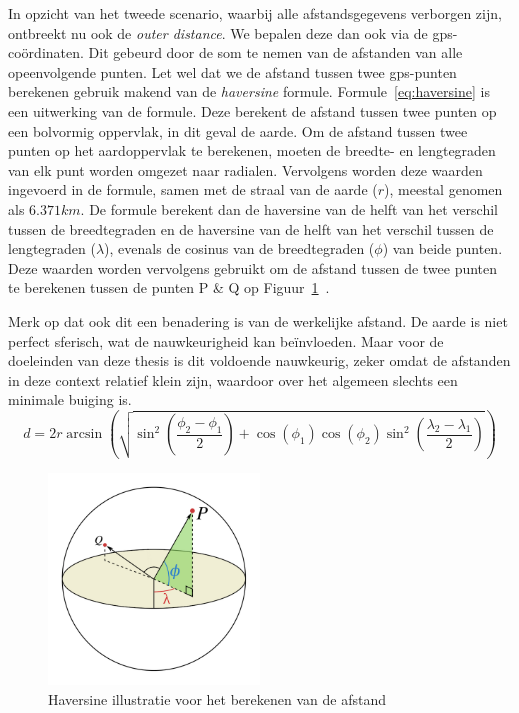 In opzicht van het tweede scenario, waarbij alle afstandsgegevens verborgen
zijn, ontbreekt nu ook de \textit{outer distance}. We bepalen deze dan ook via
de \ac{gps}-coördinaten. Dit gebeurd door de som te nemen van de afstanden van
alle opeenvolgende punten. Let wel dat we de afstand tussen twee
\ac{gps}-punten berekenen gebruik makend van de \textit{haversine} formule.
Formule~\ref{eq:haversine} is een uitwerking van de formule. Deze berekent de
afstand tussen twee punten op een bolvormig oppervlak, in dit geval de aarde.
Om de afstand tussen twee punten op het aardoppervlak te berekenen, moeten de
breedte- en lengtegraden van elk punt worden omgezet naar radialen. Vervolgens
worden deze waarden ingevoerd in de formule, samen met de straal van de aarde
($r$), meestal genomen als $6.371 km$. De formule berekent dan de haversine van
de helft van het verschil tussen de breedtegraden en de haversine van de helft
van het verschil tussen de lengtegraden ($\lambda$), evenals de cosinus van de
breedtegraden ($\phi$) van beide punten. Deze waarden worden vervolgens
gebruikt om de afstand tussen de twee punten te berekenen tussen de punten P \&
Q op Figuur~\ref{fig:haversine}~\cite{sheppard1922practical}.

Merk op dat ook dit een benadering is van de werkelijke afstand. De aarde is
niet perfect sferisch, wat de nauwkeurigheid kan beïnvloeden. Maar voor de
doeleinden van deze thesis is dit voldoende nauwkeurig, zeker omdat de
afstanden in deze context relatief klein zijn, waardoor over het algemeen
slechts een minimale buiging is.
\begin{equation}\label{eq:haversine}
    d = 2r \arcsin\left(\sqrt{\sin^2\left(\frac{\phi_2-\phi_1}{2}\right)+\cos(\phi_1)\cos(\phi_2)\sin^2\left(\frac{\lambda_2-\lambda_1}{2}\right)}\right)
\end{equation}
\begin{figure}[h]
    \centering
    \includegraphics[width=0.5\textwidth]{fig/haversine.png}
    \caption{Haversine illustratie voor het berekenen van de afstand~\cite{Distance97:online}}\label{fig:haversine}
\end{figure}

